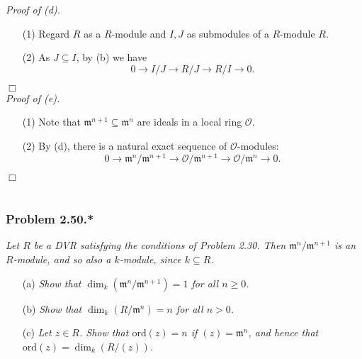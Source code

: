 \documentclass{article}
\begin{document}
\emph{Proof of (d).}
\begin{enumerate}
\item[(1)]
  Regard $R$ as a $R$-module and $I, J$ as submodules of a $R$-module $R$.

\item[(2)]
  As $J \subseteq I$, by (b) we have
  \[
    0 \to I/J \to R/J \to R/I \to 0.
  \]
\end{enumerate}
$\Box$ \\



\emph{Proof of (e).}
\begin{enumerate}
\item[(1)]
  Note that $\mathfrak{m}^{n+1} \subseteq \mathfrak{m}^{n}$ are ideals in a local ring $\mathscr{O}$.

\item[(2)]
  By (d), there is a natural exact sequence of $\mathscr{O}$-modules:
  \[
    0
    \to \mathfrak{m}^{n}/\mathfrak{m}^{n+1}
    \to \mathscr{O}/\mathfrak{m}^{n+1}
    \to \mathscr{O}/\mathfrak{m}^{n}
    \to
    0.
  \]
\end{enumerate}
$\Box$ \\\\






\subsubsection*{Problem 2.50.*}
\emph{Let $R$ be a DVR satisfying the conditions of Problem 2.30.
Then $\mathfrak{m}^{n}/\mathfrak{m}^{n+1}$ is an $R$-module, and so also a $k$-module,
since $k \subseteq R$.}
\begin{enumerate}
\item[(a)]
  \emph{Show that $\dim_k(\mathfrak{m}^{n}/\mathfrak{m}^{n+1}) = 1$
  for all $n \geq 0$.}

\item[(b)]
  \emph{Show that $\dim_k(R/\mathfrak{m}^{n}) = n$ for all $n > 0$.}

\item[(c)]
  \emph{Let $z \in R$.
  Show that $\mathrm{ord}(z) = n$ if $(z) = \mathfrak{m}^{n}$,
  and hence that $\mathrm{ord}(z) = \dim_k(R/(z))$.} \\
\end{enumerate}
\end{document}
